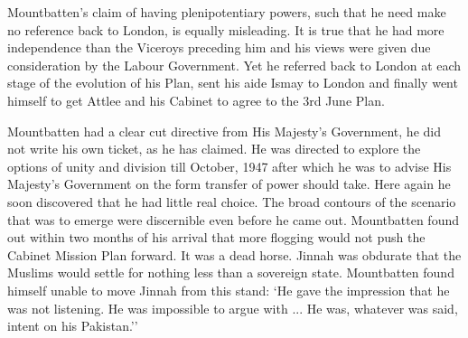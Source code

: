 \begin{multicols}{2}
Mountbatten's claim of having plenipotentiary powers, such that he need make no reference back to London, is equally misleading. It is true that he had more independence than the Viceroys preceding him and his views were given due consideration by the Labour Government. Yet he referred back to London at each stage of the evolution of his Plan, sent his aide Ismay to London and finally went himself to get Attlee and his Cabinet to agree to the 3rd June Plan. 

Mountbatten had a clear cut directive from His Majesty's Government, he did not write his own ticket, as he has claimed. He was directed to explore the options of unity and division till October, 1947 after which he was to advise His Majesty's Government on the form transfer of power should take. Here again he soon discovered that he had little real choice. The broad contours of the scenario that was to emerge were discernible even before he came out. Mountbatten found out within two months of his arrival that more flogging would not push the Cabinet Mission Plan forward. It was a dead horse. Jinnah was obdurate that the Muslims would settle for nothing less than a sovereign state. Mountbatten found himself unable to move Jinnah from this stand: `He gave the impression that he was not listening. He was impossible to argue with ... He was, whatever was said, intent on his Pakistan.'' 


\end{multicols}
